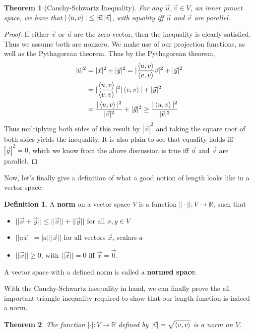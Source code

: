 \documentclass{article}
\theoremstyle{definition}
\newtheorem{definition}{Definition}[section]
\theoremstyle{plain}
\theoremstyle{theorem}
\newtheorem{theorem}{Theorem}[section]
\begin{document}
\begin{theorem}[Cauchy-Schwartz Inequality]
	For any $\vec{u},\vec{v}\in V$, an inner prouct space, we have that $|\braket{u,v}| \leq |\vec{u}||\vec{v}|$, with equality iff $\vec{u}$ and $\vec{v}$ are parallel.
\end{theorem}
\begin{proof}
	If either $\vec{v}$ or $\vec{u}$ are the zero vector, then the inequality is clearly satisfied. Thus we assume both are nonzero. We make use of our projection functions, as well as the Pythagorean theorem.  Thus by the Pythagorean theorem,
	\begin{align*} |\vec{u}|^2 &= |\vec{x}|^2+|\vec{y}|^2 = |\frac{\braket{u,v}}{\braket{v,v}}\vec{v}|^2+|\vec{y}|^2 \\
	&= |\frac{\braket{u,v}}{\braket{v,v}}|^2|\braket{v,v}| + |\vec{y}|^2 \\
	&= \frac{|\braket{u,v}|^2}{|\vec{v}|^2}+|\vec{y}|^2 \geq \frac{|\braket{u,v}|^2}{|\vec{v}|^2}
	\end{align*}
	Thus multiplying both sides of this result by $|\vec{v}|^2$ and taking the square root of both sides yields the inequality. It is also plain to see that equality holds iff $|\vec{y}|^2 = 0$, which we know from the above discussion is true iff $\vec{u}$ and $\vec{v}$ are parallel.
\end{proof}
Now, let's finally give a definition of what a good notion of length looks like in a vector space:
\begin{definition}
		A \textbf{norm} on a vector space $V$ is a function $||\cdot||:V \to \mathbb{R}$, such that
		\begin{itemize}
		\item[(Triangle Inequality)] $||\vec{x}+\vec{y}|| \leq ||\vec{x}||+||\vec{y}||$ for all $x,y \in V$
		\item[(Homogeneity)] $||a\vec{x}|| = |a|||\vec{x}||$ for all vectors $\vec{x}$, scalars $a$
		\item[(Positive Definite)] $||\vec{x}|| \geq 0$, with $||\vec{x}|| = 0$ iff $\vec{x} = \vec{0}$. 
		\end{itemize}
	A vector space with a defined norm is called a \textbf{normed space}.
\end{definition}
With the Cauchy-Schwartz inequality in hand, we can finally prove the all important triangle inequality required to show that our length function is indeed a norm.
\begin{theorem}
	The function $|\cdot|: V \to \mathbb{R}$ defined by $|\vec{v}| = \sqrt{\braket{v,v}}$ is a norm on $V$.  
\end{theorem}
\end{document}
